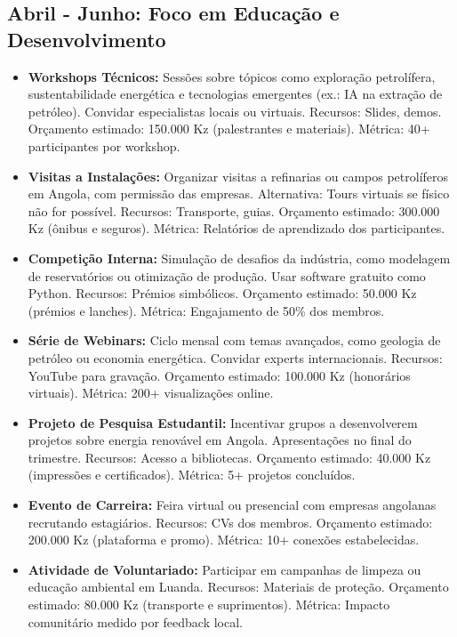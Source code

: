 \documentclass[12pt]{article}
\begin{document}
\subsection{Abril - Junho: Foco em Educação e Desenvolvimento}
\begin{itemize}
    \item \textbf{Workshops Técnicos:} Sessões sobre tópicos como exploração petrolífera, sustentabilidade energética e tecnologias emergentes (ex.: IA na extração de petróleo). Convidar especialistas locais ou virtuais. Recursos: Slides, demos. Orçamento estimado: 150.000 Kz (palestrantes e materiais). Métrica: 40+ participantes por workshop.
    \item \textbf{Visitas a Instalações:} Organizar visitas a refinarias ou campos petrolíferos em Angola, com permissão das empresas. Alternativa: Tours virtuais se físico não for possível. Recursos: Transporte, guias. Orçamento estimado: 300.000 Kz (ônibus e seguros). Métrica: Relatórios de aprendizado dos participantes.
    \item \textbf{Competição Interna:} Simulação de desafios da indústria, como modelagem de reservatórios ou otimização de produção. Usar software gratuito como Python. Recursos: Prémios simbólicos. Orçamento estimado: 50.000 Kz (prémios e lanches). Métrica: Engajamento de 50\% dos membros.
    \item \textbf{Série de Webinars:} Ciclo mensal com temas avançados, como geologia de petróleo ou economia energética. Convidar experts internacionais. Recursos: YouTube para gravação. Orçamento estimado: 100.000 Kz (honorários virtuais). Métrica: 200+ visualizações online.
    \item \textbf{Projeto de Pesquisa Estudantil:} Incentivar grupos a desenvolverem projetos sobre energia renovável em Angola. Apresentações no final do trimestre. Recursos: Acesso a bibliotecas. Orçamento estimado: 40.000 Kz (impressões e certificados). Métrica: 5+ projetos concluídos.
    \item \textbf{Evento de Carreira:} Feira virtual ou presencial com empresas angolanas recrutando estagiários. Recursos: CVs dos membros. Orçamento estimado: 200.000 Kz (plataforma e promo). Métrica: 10+ conexões estabelecidas.
    \item \textbf{Atividade de Voluntariado:} Participar em campanhas de limpeza ou educação ambiental em Luanda. Recursos: Materiais de proteção. Orçamento estimado: 80.000 Kz (transporte e suprimentos). Métrica: Impacto comunitário medido por feedback local.
\end{itemize}
\end{document}
